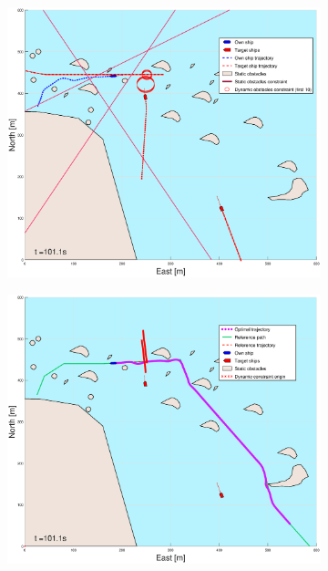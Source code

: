 \begin{figure}[ht]\ContinuedFloat
    \begin{subfigure}[b]{0.49\textwidth}
        \centering
        \includegraphics[width=\textwidth]{Images/Figures/skjergard_m_trafikk_NEW/_Simple_1fig1_time=101}
    \end{subfigure}
    \hfill
    \begin{subfigure}[b]{0.499\textwidth}
        \centering
        \includegraphics[width=\textwidth]{Images/Figures/skjergard_m_trafikk_NEW/_Simple_1fig999_time=101}

\end{subfigure}
\end{figure}
